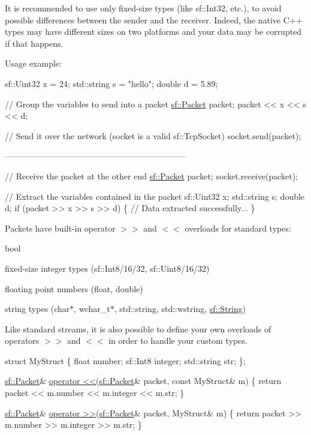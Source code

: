 It is recommended to use only fixed-\/size types (like sf\+::\+Int32, etc.), to avoid possible differences between the sender and the receiver. Indeed, the native C++ types may have different sizes on two platforms and your data may be corrupted if that happens.

Usage example\+: 
\begin{DoxyCode}
sf::Uint32 x = 24;
std::string s = \textcolor{stringliteral}{"hello"};
\textcolor{keywordtype}{double} d = 5.89;

\textcolor{comment}{// Group the variables to send into a packet}
\hyperlink{classsf_1_1_packet}{sf::Packet} packet;
packet << x << s << d;

\textcolor{comment}{// Send it over the network (socket is a valid sf::TcpSocket)}
socket.send(packet);

-----------------------------------------------------------------

\textcolor{comment}{// Receive the packet at the other end}
\hyperlink{classsf_1_1_packet}{sf::Packet} packet;
socket.receive(packet);

\textcolor{comment}{// Extract the variables contained in the packet}
sf::Uint32 x;
std::string s;
\textcolor{keywordtype}{double} d;
\textcolor{keywordflow}{if} (packet >> x >> s >> d)
\{
    \textcolor{comment}{// Data extracted successfully...}
\}
\end{DoxyCode}


Packets have built-\/in operator $>$$>$ and $<$$<$ overloads for standard types\+: \begin{DoxyItemize}
\item bool \item fixed-\/size integer types (sf\+::\+Int8/16/32, sf\+::\+Uint8/16/32) \item floating point numbers (float, double) \item string types (char$\ast$, wchar\+\_\+t$\ast$, std\+::string, std\+::wstring, \hyperlink{classsf_1_1_string}{sf\+::\+String})\end{DoxyItemize}
Like standard streams, it is also possible to define your own overloads of operators $>$$>$ and $<$$<$ in order to handle your custom types.


\begin{DoxyCode}
\textcolor{keyword}{struct }MyStruct
\{
    \textcolor{keywordtype}{float}       number;
    sf::Int8    integer;
    std::string str;
\};

\hyperlink{classsf_1_1_packet}{sf::Packet}& \hyperlink{classsf_1_1_packet_aa5a465ed02ba29d83ecdafb0ac3fff21}{operator <<}(\hyperlink{classsf_1_1_packet}{sf::Packet}& packet, \textcolor{keyword}{const} MyStruct& m)
\{
    \textcolor{keywordflow}{return} packet << m.number << m.integer << m.str;
\}

\hyperlink{classsf_1_1_packet}{sf::Packet}& \hyperlink{classsf_1_1_packet_af8e26c63ba9bdccd262565ff0d3eeba2}{operator >>}(\hyperlink{classsf_1_1_packet}{sf::Packet}& packet, MyStruct& m)
\{
    \textcolor{keywordflow}{return} packet >> m.number >> m.integer >> m.str;
\}
\end{DoxyCode}


